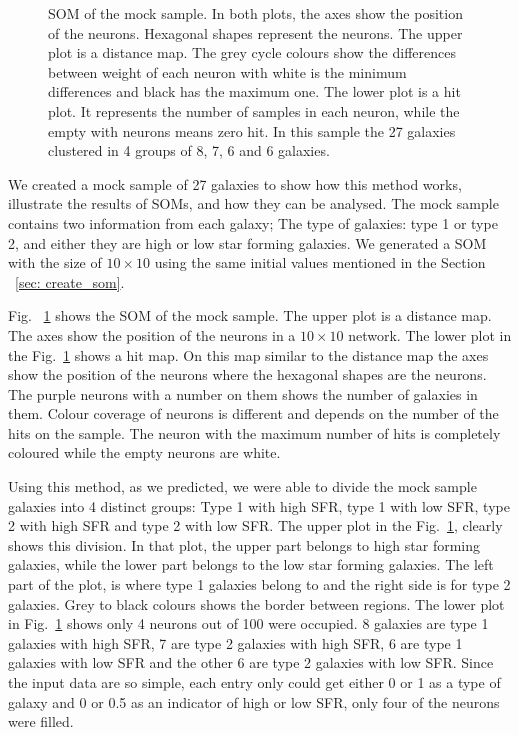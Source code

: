 \documentclass[useAMS,usenatbib]{mn2e}
\begin{document}
\begin{figure}
\begin{subfigure}[b]{0.5\textwidth}
            \end{subfigure}
            \caption{SOM of the mock sample. In both plots, the axes show the position of the neurons. Hexagonal shapes represent the neurons. The upper plot is a distance map. The grey cycle colours show the differences between weight of each neuron with white is the minimum differences and black has the maximum one. The lower plot is a hit plot. It represents the number of samples in each neuron, while the empty with neurons means zero hit. In this sample the 27 galaxies clustered in 4 groups of 8, 7, 6 and 6 galaxies.}
            \label{fig: sample}
        \end{figure}
 
 We created  a mock sample of 27 galaxies to show how this method works, illustrate the results of SOMs, and how they can be analysed.
 The mock sample contains two information from each galaxy; The type of galaxies: type 1 or type 2, and either they are high or low star forming galaxies. 
 We generated a SOM with the size of $10 \times 10$ using the same initial values mentioned in the Section ~\ref{sec: create_som}.

 Fig. ~\ref{fig: sample} shows the SOM of the mock sample. 
 The upper plot is a distance map. 
 The axes show the position of the neurons in a $10 \times 10$ network.
 The lower plot in the Fig.~\ref{fig: sample} shows a hit map.
 On this map similar to the distance map the axes show the position of the neurons where the hexagonal shapes are the neurons.
 The purple neurons with a number on them shows the number of galaxies in them.
 Colour coverage of neurons is different and depends on the number of the hits on the sample.
 The neuron with the maximum number of hits is completely coloured while the empty neurons are white.
 
Using this method, as we predicted, we were able to divide the mock sample galaxies into 4 distinct groups: Type 1 with high SFR, type 1 with low SFR, type 2 with high SFR and type 2 with low SFR. 
The upper plot in the Fig.~\ref{fig: sample}, clearly shows this division.
In that plot, the upper part belongs to high star forming galaxies, while the lower part belongs to the low star forming galaxies.
The left part of the plot, is where type 1 galaxies belong to and the right side is for type 2 galaxies.
Grey to black colours shows the border between regions.
The lower plot in Fig.~\ref{fig: sample} shows only 4 neurons out of 100 were occupied. 
8 galaxies are type 1 galaxies with high SFR, 7 are type 2 galaxies with high SFR, 6 are type 1 galaxies with low SFR and the other 6 are type 2 galaxies with low SFR. 
Since the input data are so simple, each entry only could get either 0 or 1 as a type of galaxy and 0 or 0.5 as an indicator of  high or low SFR, only four of the neurons were filled.
\end{document}
